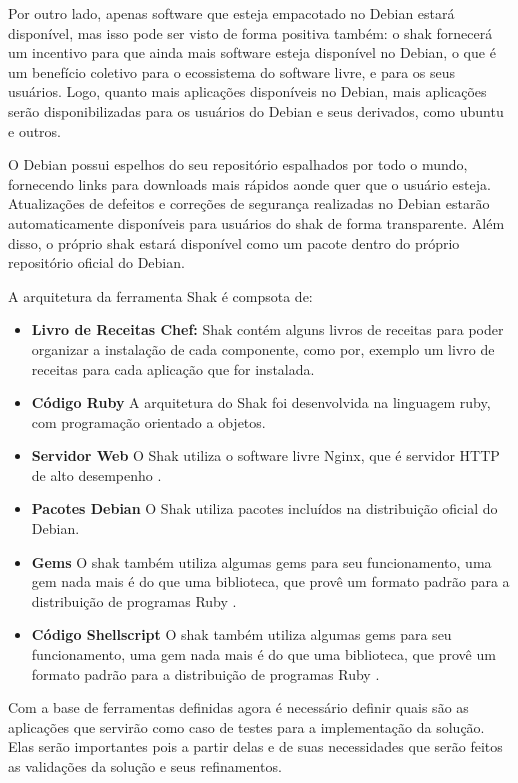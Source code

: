 Por outro lado, apenas software que esteja empacotado no Debian estará
disponível, mas isso pode ser visto de forma positiva também: o shak
fornecerá um incentivo para que ainda mais software esteja disponível no
Debian, o que é um benefício coletivo para o ecossistema do software livre, e
para os seus usuários. Logo, quanto mais aplicações disponíveis no Debian,
mais aplicações serão disponibilizadas para os usuários do Debian e seus derivados,
como ubuntu e outros.

O Debian possui espelhos do seu repositório espalhados por todo o mundo,
fornecendo links para downloads mais rápidos aonde quer que o usuário esteja.
Atualizações de defeitos e correções de segurança realizadas no Debian estarão
automaticamente disponíveis para usuários do shak de forma transparente. Além disso,
o próprio shak estará disponível como um pacote dentro do próprio repositório oficial do Debian.

A arquitetura da ferramenta Shak é compsota de:

\begin{itemize}
  \item  \textbf{Livro de Receitas Chef:} Shak contém alguns livros de receitas
  para poder organizar a instalação de cada componente, como por, exemplo um livro
  de receitas para cada aplicação que for instalada.
  \item  \textbf{Código Ruby} A arquitetura do Shak foi desenvolvida na linguagem
  ruby, com programação orientado a objetos.
  \item  \textbf{Servidor Web} O Shak utiliza o software livre Nginx, que é
  servidor HTTP de alto desempenho \cite{nginx}.
  \item  \textbf{Pacotes Debian} O Shak utiliza pacotes incluídos na distribuição
  oficial do Debian.
  \item  \textbf{Gems} O shak também utiliza algumas gems para seu funcionamento,
  uma gem nada mais é do que uma biblioteca, que provê um formato padrão para
  a distribuição de programas Ruby \cite{gem}.
  \item  \textbf{Código Shellscript} O shak também utiliza algumas gems para seu funcionamento,
  uma gem nada mais é do que uma biblioteca, que provê um formato padrão para
  a distribuição de programas Ruby \cite{gem}.
\end{itemize}

Com a base de ferramentas definidas agora é necessário definir quais são as
aplicações que servirão como caso de testes para a implementação da solução. Elas
serão importantes pois a partir delas e de suas necessidades que serão feitos as
validações da solução e seus refinamentos.


